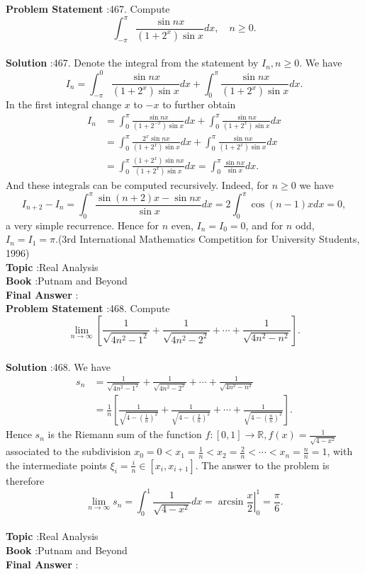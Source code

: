 \documentclass[10pt]{article}
\begin{document}
\textbf{Problem Statement} :467. Compute$$ \int_{-\pi}^{\pi} \frac{\sin n x}{\left(1+2^{x}\right) \sin x} d x, \quad n \geq 0 . $$\\
\textbf{Solution} :467. Denote the integral from the statement by $I_{n}, n \geq 0$. We have$$ I_{n}=\int_{-\pi}^{0} \frac{\sin n x}{\left(1+2^{x}\right) \sin x} d x+\int_{0}^{\pi} \frac{\sin n x}{\left(1+2^{x}\right) \sin x} d x . $$In the first integral change $x$ to $-x$ to further obtain$$ \begin{aligned} I_{n} &=\int_{0}^{\pi} \frac{\sin n x}{\left(1+2^{-x}\right) \sin x} d x+\int_{0}^{\pi} \frac{\sin n x}{\left(1+2^{x}\right) \sin x} d x \\ &=\int_{0}^{\pi} \frac{2^{x} \sin n x}{\left(1+2^{x}\right) \sin x} d x+\int_{0}^{\pi} \frac{\sin n x}{\left(1+2^{x}\right) \sin x} d x \\ &=\int_{0}^{\pi} \frac{\left(1+2^{x}\right) \sin n x}{\left(1+2^{x}\right) \sin x} d x=\int_{0}^{\pi} \frac{\sin n x}{\sin x} d x . \end{aligned} $$And these integrals can be computed recursively. Indeed, for $n \geq 0$ we have$$ I_{n+2}-I_{n}=\int_{0}^{\pi} \frac{\sin (n+2) x-\sin n x}{\sin x} d x=2 \int_{0}^{\pi} \cos (n-1) x d x=0, $$a very simple recurrence. Hence for $n$ even, $I_{n}=I_{0}=0$, and for $n$ odd, $I_{n}=I_{1}=\pi$.(3rd International Mathematics Competition for University Students, 1996) \\
\textbf{Topic} :Real Analysis\\
\textbf{Book} :Putnam and Beyond\\
\textbf{Final Answer} :\\


\textbf{Problem Statement} :468. Compute$$ \lim _{n \rightarrow \infty}\left[\frac{1}{\sqrt{4 n^{2}-1^{2}}}+\frac{1}{\sqrt{4 n^{2}-2^{2}}}+\cdots+\frac{1}{\sqrt{4 n^{2}-n^{2}}}\right] . $$\\
\textbf{Solution} :468. We have$$ \begin{aligned} s_{n} &=\frac{1}{\sqrt{4 n^{2}-1^{2}}}+\frac{1}{\sqrt{4 n^{2}-2^{2}}}+\cdots+\frac{1}{\sqrt{4 n^{2}-n^{2}}} \\ &=\frac{1}{n}\left[\frac{1}{\sqrt{4-\left(\frac{1}{n}\right)^{2}}}+\frac{1}{\sqrt{4-\left(\frac{2}{n}\right)^{2}}}+\cdots+\frac{1}{\sqrt{4-\left(\frac{n}{n}\right)^{2}}}\right] . \end{aligned} $$Hence $s_{n}$ is the Riemann sum of the function $f:[0,1] \rightarrow \mathbb{R}, f(x)=\frac{1}{\sqrt{4-x^{2}}}$ associated to the subdivision $x_{0}=0<x_{1}=\frac{1}{n}<x_{2}=\frac{2}{n}<\cdots<x_{n}=\frac{n}{n}=1$, with the intermediate points $\xi_{i}=\frac{i}{n} \in\left[x_{i}, x_{i+1}\right]$. The answer to the problem is therefore$$ \lim _{n \rightarrow \infty} s_{n}=\int_{0}^{1} \frac{1}{\sqrt{4-x^{2}}} d x=\left.\arcsin \frac{x}{2}\right|_{0} ^{1}=\frac{\pi}{6} . $$\\
\textbf{Topic} :Real Analysis\\
\textbf{Book} :Putnam and Beyond\\
\textbf{Final Answer} :\\
\end{document}
